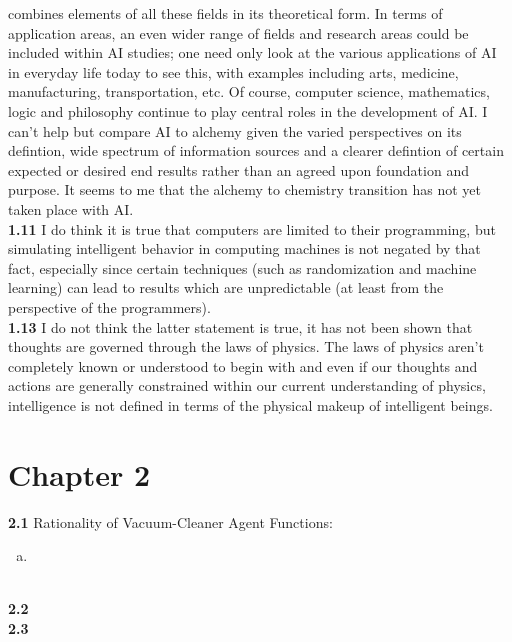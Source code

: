\documentclass{scrartcl}
\begin{document}
combines elements of all these fields in its theoretical form. In terms of application areas, an
even wider range of fields and research areas could be included within AI studies; one need only
look at the various applications of AI in everyday life today to see this, with examples including
arts, medicine, manufacturing, transportation, etc. Of course, computer science, mathematics, logic
and philosophy continue to play central roles in the development of AI. I can't help but compare AI
to alchemy given the varied perspectives on its defintion, wide spectrum of information sources and
a clearer defintion of certain expected or desired end results rather than an agreed upon foundation
and purpose. It seems to me that the alchemy to chemistry transition has not yet taken place with AI.
\bigskip
\\
\textbf{1.11} I do think it is true that computers are limited to their programming, but simulating
intelligent behavior in computing machines is not negated by that fact, especially since certain
techniques (such as randomization and machine learning) can lead to results which are unpredictable
(at least from the perspective of the programmers).
\bigskip
\\
\textbf{1.13} I do not think the latter statement is true, it has not been shown that thoughts are
governed through the laws of physics. The laws of physics aren't completely known or understood to
begin with and even if our thoughts and actions are generally constrained within our current
understanding of physics, intelligence is not defined in terms of the physical makeup of intelligent
beings.
\section*{Chapter 2}
\textbf{2.1} Rationality of Vacuum-Cleaner Agent Functions:
\begin{enumerate}[(a)]
    \item
\end{enumerate}
\bigskip
\\
\textbf{2.2}
\bigskip
\\
\textbf{2.3}
\end{document}
